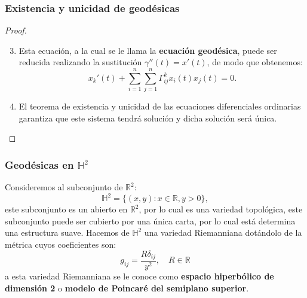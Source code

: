 \begin{frame}
	\frametitle{Existencia y unicidad de geodésicas}
	\begin{proof}
		\begin{enumerate}
			\setcounter{enumi}{2}
		\item Esta ecuación, a la cual se le llama la \textbf{ecuación geodésica}, puede ser reducida realizando la sustitución $\gamma''(t) = x'(t)$, de modo que obtenemos:
			      \[
				      x_{k}'(t) + \sum_{i=1}^{n} \sum_{j=1}^{n} \Gamma_{ij}^{k} x_{i}(t) x_{j}(t) = 0.
			      \] \pause
			\item El teorema de existencia y unicidad de las ecuaciones diferenciales ordinarias garantiza que este sistema tendrá solución y dicha solución será única.
		\end{enumerate}
	\end{proof}
\end{frame}

\begin{frame}
	\frametitle{Geodésicas en $\mathbb{H}^2$}
	\begin{definition}
		Consideremos al subconjunto de $\mathbb{R}^{2}$:
		\[
			\mathbb{H}^{2} = \{(x,y) : x \in \mathbb{R}, y > 0\},
		\]\pause
		este subconjunto es un abierto en $\mathbb{R}^{2}$, por lo cual es una variedad topológica, este subconjunto puede ser cubierto por una única carta, por lo cual está determina una estructura suave. \pause Hacemos de $\mathbb{H}^{2}$ una variedad Riemanniana dotándolo de la métrica cuyos coeficientes son:
		\[
			g_{ij} = \frac{R \delta_{ij}}{y^{2}}, \quad R \in \mathbb{R}
		\]\pause
		a esta variedad Riemanniana se le conoce como \textbf{espacio hiperbólico de dimensión 2} o \textbf{modelo de Poincaré del semiplano superior}.
	\end{definition}
\end{frame}

